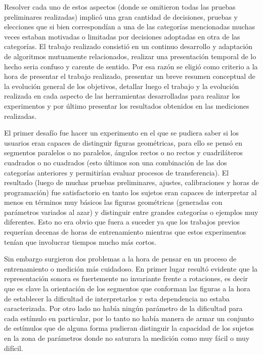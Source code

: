 \documentclass{article}
\numberwithin{figure}{section}
\begin{document}
    Resolver cada uno de estos aspectos (donde se omitieron todas las pruebas preliminares realizadas) implicó una gran cantidad de decisiones, pruebas y elecciones que si bien correspondían a una de las categorías mencionadas muchas veces estaban motivadas o limitadas por decisiones adoptadas en otra de las categorías. El trabajo realizado consistió en un continuo desarrollo y adaptación de algoritmos mutuamente relacionados, realizar una presentación temporal de lo hecho seria confuso y carente de sentido. Por esa razón se eligió como criterio a la hora de presentar el trabajo realizado, presentar un breve resumen conceptual de la evolución general de los objetivos, detallar luego el trabajo y la evolución realizada en cada aspecto de las herramientas desarrolladas para realizar los experimentos y por último presentar los resultados obtenidos en las mediciones realizadas. 
    
    El primer desafío fue hacer un experimento en el que se pudiera saber si los usuarios eran capaces de distinguir figuras geométricas, para ello se pensó en segmentos paralelos o no paralelos, ángulos rectos o no rectos y cuadriláteros cuadrados o no cuadrados (esto últimos son una combinación de las dos categorías anteriores y permitirían evaluar procesos de transferencia). El resultado (luego de muchas pruebas preliminares, ajustes, calibraciones y horas de programación) fue satisfactorio en tanto los sujetos eran capaces de interpretar al menos en términos muy básicos las figuras geométricas (generadas con parámetros variados al azar) y distinguir entre grandes categorías o ejemplos muy diferentes. Esto no era obvio que fuera a suceder ya que los trabajos previos requerían decenas de horas de entrenamiento mientras que estos experimentos tenían que involucrar tiempos mucho más cortos.
    
    Sin embargo surgieron dos problemas a la hora de pensar en un proceso de entrenamiento o medición más cuidadoso. En primer lugar resultó evidente que la representación sonora es fuertemente no invariante frente a rotaciones, es decir que es clave la orientación de los segmentos que conforman las figuras a la hora de establecer la dificultad de interpretarlos y esta dependencia no estaba caracterizada. Por otro lado no había ningún parámetro de la dificultad para cada estímulo en particular, por lo tanto no había manera de armar un conjunto de estímulos que de alguna forma pudieran distinguir la capacidad de los sujetos en la zona de parámetros donde no saturara la medición como muy fácil o muy difícil. 
    
\end{document}
